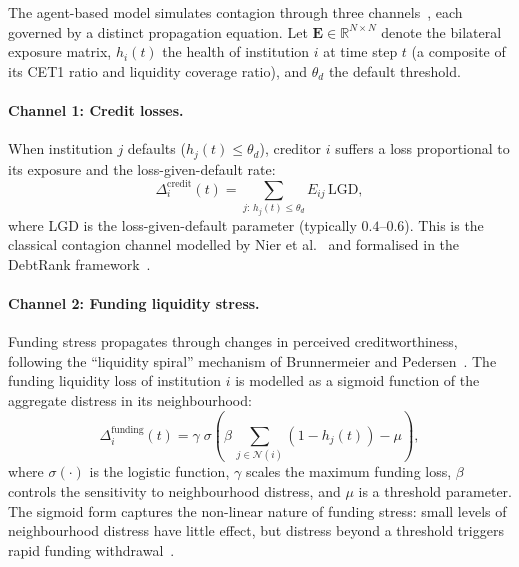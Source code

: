 The agent-based model simulates contagion through three
channels~\cite{nier2007network,gai2010contagion,caccioli2015overlapping},
each governed by a distinct propagation equation.  Let
$\mathbf{E} \in \mathbb{R}^{N \times N}$ denote the bilateral exposure
matrix, $h_i(t)$ the health of institution $i$ at time step $t$ (a
composite of its CET1 ratio and liquidity coverage ratio), and
$\theta_d$ the default threshold.

\paragraph{Channel 1: Credit losses.}
When institution $j$ defaults ($h_j(t) \leq \theta_d$), creditor $i$
suffers a loss proportional to its exposure and the loss-given-default
rate:
\begin{equation}
\Delta_i^{\text{credit}}(t) = \sum_{j:\,h_j(t) \leq \theta_d}
E_{ij}\,\text{LGD},
\label{eq:credit_loss}
\end{equation}
where LGD is the loss-given-default parameter (typically $0.4$--$0.6$).
This is the classical contagion channel modelled by Nier et
al.~\cite{nier2007network} and formalised in the DebtRank
framework~\cite{battiston2012debtrank}.

\paragraph{Channel 2: Funding liquidity stress.}
Funding stress propagates through changes in perceived creditworthiness,
following the ``liquidity spiral'' mechanism of Brunnermeier and
Pedersen~\cite{brunnermeier2009market}.  The funding liquidity loss
of institution $i$ is modelled as a sigmoid function of the aggregate
distress in its neighbourhood:
\begin{equation}
\Delta_i^{\text{funding}}(t) = \gamma\;\sigma\!\left(
\beta\,\sum_{j \in \mathcal{N}(i)} (1 - h_j(t)) - \mu\right),
\label{eq:funding_loss}
\end{equation}
where $\sigma(\cdot)$ is the logistic function, $\gamma$ scales the
maximum funding loss, $\beta$ controls the sensitivity to neighbourhood
distress, and $\mu$ is a threshold parameter.  The sigmoid form captures
the non-linear nature of funding stress: small levels of neighbourhood
distress have little effect, but distress beyond a threshold triggers
rapid funding withdrawal~\cite{gai2010contagion}.

